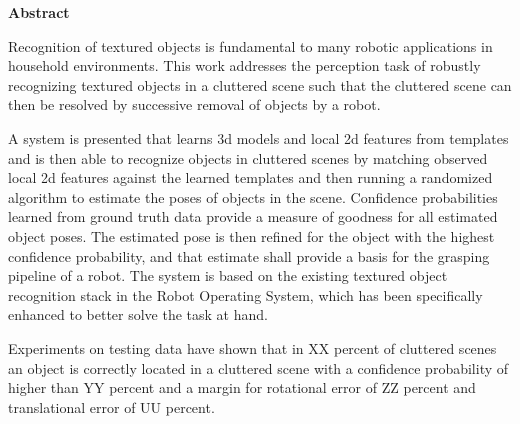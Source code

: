 

\clearemptydoublepage
{}
{}	





\vspace*{2cm}
\begin{center}
{\Large \bf Abstract}
\end{center}
\vspace{1cm}

Recognition of textured objects is fundamental to many robotic applications in
household environments. This work addresses the perception task of robustly
recognizing textured objects in a cluttered scene such that the cluttered scene
can then be resolved by successive removal of objects by a robot.

A system is presented that learns 3d models and local 2d features from
templates and is then able to recognize objects in cluttered scenes by matching
observed local 2d features against the learned templates and then running a
randomized algorithm to estimate the poses of objects in the scene. Confidence
probabilities learned from ground truth data provide a measure of goodness for
all estimated object poses.  The estimated pose is then refined for the object
with the highest confidence probability, and that estimate shall provide a
basis for the grasping pipeline of a robot. The system is based on the existing
textured object recognition stack in the Robot Operating System, which has been
specifically enhanced to better solve the task at hand.

Experiments on testing data have shown that in XX percent of cluttered scenes
an object is correctly located in a cluttered scene with a confidence
probability of higher than YY percent and a margin for rotational error of ZZ
percent and translational error of UU percent.

